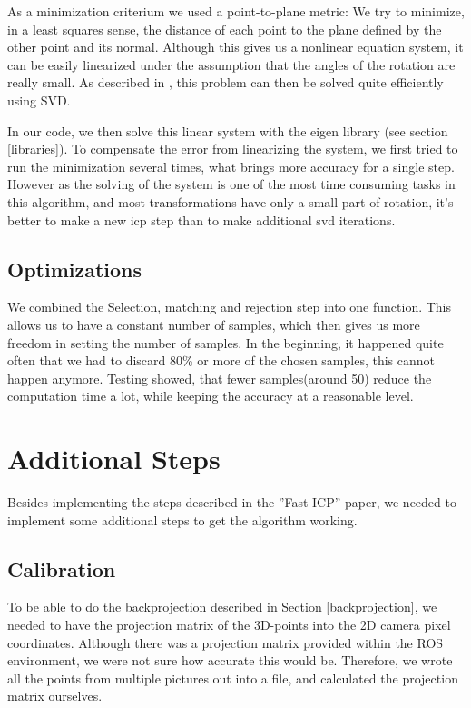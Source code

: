 \documentclass[10pt,twocolumn,letterpaper]{article}
\begin{document}
As a minimization criterium we used a point-to-plane metric: We try to minimize, in a least squares sense, the distance of each point to the plane
defined by the other point and its normal. Although this gives us a nonlinear equation system, it can be easily linearized under the assumption
that the angles of the rotation are really small. As described in \cite{ptp}, this problem can then be solved quite efficiently using SVD.

In our code, we then solve this linear system with the eigen library (see section \ref{libraries}).
To compensate the error from linearizing the system, we first tried to run the minimization several times, what brings more accuracy for a single step. 
However as the solving of the system is one of the most time consuming tasks in this algorithm,
and most transformations have only a small part of rotation, it's better to make a new icp step than to make additional svd iterations.

\subsection{Optimizations}
We combined the Selection, matching and rejection step into one function. This allows us to have a constant number of samples,
which then gives us more freedom in setting the number of samples. In the beginning, it happened quite often that we had to discard
80\% or more of the chosen samples, this cannot happen anymore. Testing showed, that fewer samples(around 50) reduce the computation
time a lot, while keeping the accuracy at a reasonable level.

\section{Additional Steps}
Besides implementing the steps described in the ''Fast ICP''\cite{fasticp} paper,
we needed to implement some additional steps to get the algorithm working.

\subsection{Calibration}
To be able to do the backprojection described in Section \ref{backprojection}, we needed to have the projection matrix of the 3D-points
into the 2D camera pixel coordinates.
Although there was a projection matrix provided within the ROS environment, we were not sure how accurate this would be. Therefore, we
wrote all the points from multiple pictures out into a file, and calculated the projection matrix ourselves. 
\end{document}
